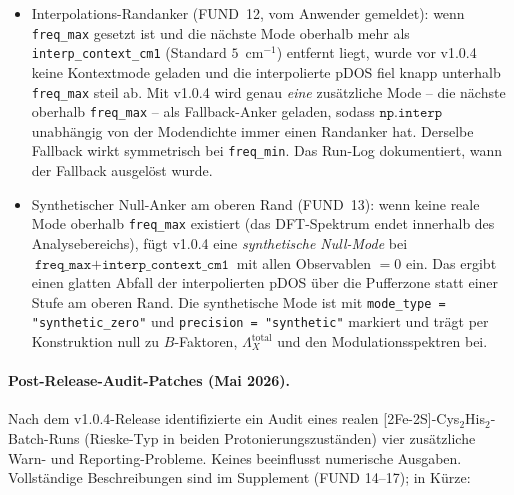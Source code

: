 \documentclass[11pt,a4paper,twoside]{article}
\theoremstyle{remark}
\begin{document}
\begin{itemize}
        \texttt{UserWarning} ausgegeben (pro Session dedupliziert).
        Falls Sie in einem zuvor stillen Log neue Warnungen sehen,
        pr\"ufen Sie die betroffenen Liganden- oder
        Atomzuordnungen, bevor Sie den entsprechenden Excel-Zeilen
        vertrauen.
  \item Interpolations-Randanker (FUND~12, vom Anwender gemeldet):
        wenn \texttt{freq\_max} gesetzt ist und die n\"achste Mode
        oberhalb mehr als \texttt{interp\_context\_cm1} (Standard
        $5$~cm$^{-1}$) entfernt liegt, wurde vor v1.0.4 keine
        Kontextmode geladen und die interpolierte pDOS fiel knapp
        unterhalb \texttt{freq\_max} steil ab. Mit v1.0.4 wird
        genau \emph{eine} zus\"atzliche Mode -- die n\"achste
        oberhalb \texttt{freq\_max} -- als Fallback-Anker geladen,
        sodass $\texttt{np.interp}$ unabh\"angig von der Modendichte
        immer einen Randanker hat. Derselbe Fallback wirkt
        symmetrisch bei \texttt{freq\_min}. Das Run-Log dokumentiert,
        wann der Fallback ausgel\"ost wurde.
  \item Synthetischer Null-Anker am oberen Rand (FUND~13): wenn
        keine reale Mode oberhalb \texttt{freq\_max} existiert
        (das DFT-Spektrum endet innerhalb des Analysebereichs),
        f\"ugt v1.0.4 eine \emph{synthetische Null-Mode} bei
        $\texttt{freq\_max} + \texttt{interp\_context\_cm1}$ mit
        allen Observablen $= 0$ ein. Das ergibt einen glatten Abfall
        der interpolierten pDOS \"uber die Pufferzone statt einer
        Stufe am oberen Rand. Die synthetische Mode ist mit
        \texttt{mode\_type = "synthetic\_zero"} und
        \texttt{precision = "synthetic"} markiert und tr\"agt per
        Konstruktion null zu $B$-Faktoren,
        $\Lambda_X^\text{total}$ und den Modulationsspektren bei.
\end{itemize}

\paragraph{Post-Release-Audit-Patches (Mai 2026).} Nach dem
v1.0.4-Release identifizierte ein Audit eines realen
[2Fe-2S]-Cys$_2$His$_2$-Batch-Runs (Rieske-Typ in beiden
Protonierungszust\"anden) vier zus\"atzliche Warn- und Reporting-Probleme. Keines beeinflusst
numerische Ausgaben. Vollst\"andige Beschreibungen sind im Supplement
(FUND 14--17); in K\"urze:
\end{document}
